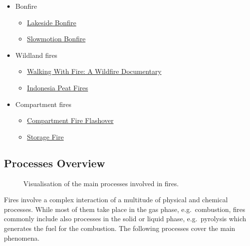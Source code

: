 \documentclass[
  letterpaper,
  DIV=11,
  numbers=noendperiod]{scrreprt}
\providecommand{\tightlist}{%
  \setlength{\itemsep}{0pt}\setlength{\parskip}{0pt}}\usepackage{longtable,booktabs,array}
\begin{document}
\begin{itemize}
\tightlist
\item
  Bonfire

  \begin{itemize}
  \tightlist
  \item
    \href{https://youtu.be/NUKKzdVy0EI}{Lakeside Bonfire}
  \item
    \href{https://uni-wuppertal.sciebo.de/s/e0c3Ut8OolZGTC8}{Slowmotion
    Bonfire}
  \end{itemize}
\item
  Wildland fires

  \begin{itemize}
  \tightlist
  \item
    \href{https://youtu.be/6y0__CZI-Cw}{Walking With Fire: A Wildfire
    Documentary}
  \item
    \href{https://youtu.be/2qYzTU0q9XE}{Indonesia Peat Fires}
  \end{itemize}
\item
  Compartment fires

  \begin{itemize}
  \tightlist
  \item
    \href{https://youtu.be/w4W82HIzUcc}{Compartment Fire Flashover}
  \item
    \href{https://youtu.be/xzuNVFn0U48}{Storage Fire}
  \end{itemize}
\end{itemize}

\subsection{Processes Overview}\label{processes-overview}

\begin{figure}


\caption{\label{fig-fire-processes}Visualisation of the main processes
involved in fires.}

\end{figure}%

Fires involve a complex interaction of a multitude of physical and
chemical processes. While most of them take place in the gas phase,
e.g.~combustion, fires commonly include also processes in the solid or
liquid phase, e.g.~pyrolysis which generates the fuel for the
combustion. The following processes cover the main phenomena.
\end{document}
